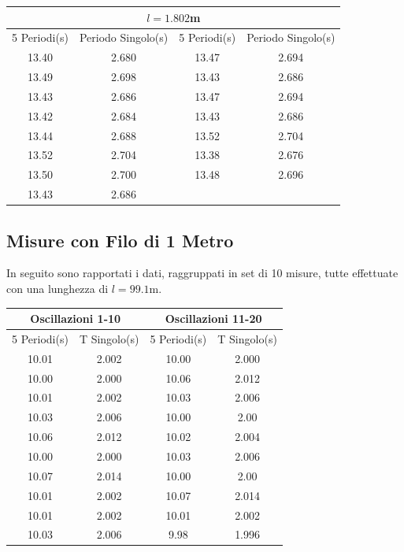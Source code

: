 \documentclass[a4paper]{article}
\begin{document}
\begin{center}
    \begin{tabular}{|c|c|c|c|}
    \hline
    \multicolumn{4}{|c|}{$l=1.802$m} \\
    \hline
    5 Periodi(s) & Periodo Singolo(s) & 5 Periodi(s) & Periodo Singolo(s) \\
    \hline
     13.40 & 2.680 & 13.47 & 2.694 \\
     13.49 & 2.698 & 13.43 & 2.686 \\
     13.43 & 2.686 & 13.47 & 2.694 \\
     13.42 & 2.684 & 13.43 & 2.686 \\
     13.44 & 2.688 & 13.52 & 2.704 \\
     13.52 & 2.704 & 13.38 & 2.676 \\
     13.50 & 2.700 & 13.48 & 2.696 \\ 
     13.43 & 2.686 & & \\
    \hline
    \end{tabular}
\end{center}

\subsection{Misure con Filo di 1 Metro} \label{Misura 1 metro}
In seguito sono rapportati i dati, raggruppati in set di 10 misure, tutte effettuate con una lunghezza di $l=99.1$m.
\begin{center}
    \tabcolsep=0.11cm
    \begin{tabular}{|c|c||c|c|}
    \hline
    \multicolumn{2}{|c||}{Oscillazioni 1-10} & \multicolumn{2}{|c|}{Oscillazioni 11-20} \\
    \hline
    5 Periodi(s) & T Singolo(s) & 5 Periodi(s) & T Singolo(s) \\
    \hline
      10.01 & 2.002 & 10.00 & 2.000 \\
      10.00 & 2.000 & 10.06 & 2.012\\
      10.01 & 2.002 & 10.03 & 2.006\\
      10.03 & 2.006 & 10.00 & 2.00\\
      10.06 & 2.012 & 10.02 & 2.004\\
      10.00 & 2.000 & 10.03 & 2.006\\
      10.07 & 2.014 & 10.00 & 2.00\\ 
      10.01 & 2.002 & 10.07 & 2.014\\
      10.01 & 2.002 & 10.01 & 2.002\\
      10.03 & 2.006 &  9.98 & 1.996\\
    \hline
    \end{tabular}
\end{center}
\end{document}
